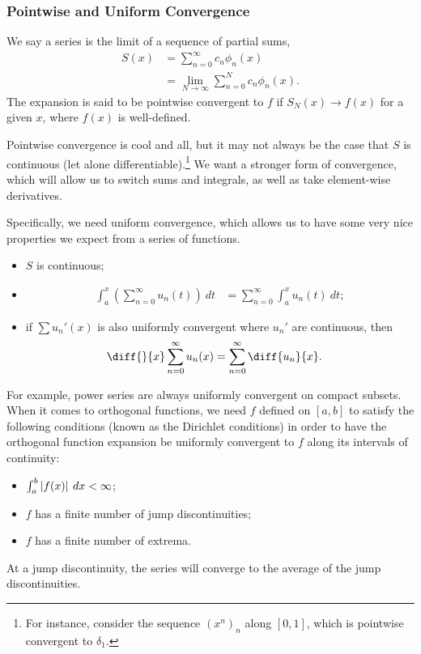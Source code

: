 \documentclass[10pt]{mypackage}
\begin{document}
\subsubsection{Pointwise and Uniform Convergence}%
We say a series is the limit of a sequence of partial sums,
\begin{align*}
  S\left(x\right) &= \sum_{n=0}^{\infty}c_n\phi_n(x)\\
                  &= \lim_{N\rightarrow\infty}\sum_{n=0}^{N}c_n\phi_n(x).
\end{align*}
The expansion is said to be pointwise convergent to $f$ if $S_N(x)\rightarrow f(x)$ for a given $x$, where $f(x)$ is well-defined.\newline

Pointwise convergence is cool and all, but it may not always be the case that $S$ is continuous (let alone differentiable).\footnote{For instance, consider the sequence $\left(x^n\right)_{n}$ along $\left[0,1\right]$, which is pointwise convergent to $\delta_1$.} We want a stronger form of convergence, which will allow us to switch sums and integrals, as well as take element-wise derivatives.\newline

Specifically, we need uniform convergence, which allows us to have some very nice properties we expect from a series of functions.
\begin{itemize}
  \item $S$ is continuous;
  \item 
    \begin{align*}
      \int_{a}^{x} \left(\sum_{n=0}^{\infty}u_n(t)\right)\:dt &= \sum_{n=0}^{\infty}\int_{a}^{x} u_n(t)\:dt;
    \end{align*}
  \item if $\sum u_n'(x)$ is also uniformly convergent where $u_n'$ are continuous, then
    \begin{align*}
      \diff{}{x}\sum_{n=0}^{\infty}u_n(x) &= \sum_{n=0}^{\infty}\diff{u_n}{x}.
    \end{align*}
\end{itemize}
For example, power series are always uniformly convergent on compact subsets. When it comes to orthogonal functions, we need $f$ defined on $[a,b]$ to satisfy the following conditions (known as the Dirichlet conditions) in order to have the orthogonal function expansion be uniformly convergent to $f$ along its intervals of continuity:
\begin{itemize}
  \item $\int_{a}^{b} \left\vert f(x) \right\vert\:dx < \infty \displaystyle$;
  \item $f$ has a finite number of jump discontinuities;
  \item $f$ has a finite number of extrema.
\end{itemize}
At a jump discontinuity, the series will converge to the average of the jump discontinuities.\newline
\end{document}
